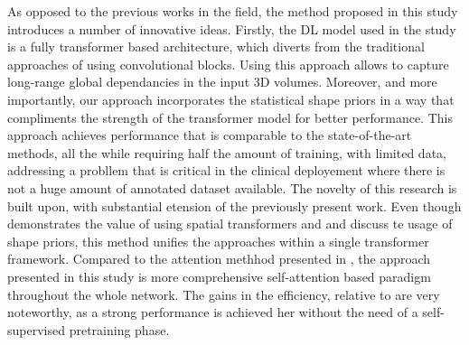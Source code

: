 As opposed to the previous works in the field, the method proposed in this study introduces a number of innovative ideas. Firstly, the DL model used in the study is a fully transformer based architecture, which diverts from the traditional approaches of using convolutional blocks. Using this approach allows to capture long-range global dependancies in the input 3D volumes. Moreover, and more importantly, our approach incorporates the statistical shape priors in a way that compliments the strength of the transformer model for better performance. This approach achieves performance that is comparable to the state-of-the-art methods, all the while requiring half the amount of training, with limited data, addressing a probllem that is critical in the clinical deployement where there is not a huge amount of annotated dataset available. The novelty of this research is built upon, with substantial etension of the previously present work. Even though \cite{10488032} demonstrates the value of using spatial transformers and  and \cite{ZHU2023106954} discuss te usage of shape priors, this method unifies the approaches within a single transformer framework. Compared to the attention methhod presented in \cite{ZHANG2023107267}, the approach presented in this study is more comprehensive self-attention based paradigm throughout the whole network. The gains in the efficiency, relative to \cite{10.1145/3632047.3632078} are very noteworthy, as a strong performance is achieved her without the need of a self-supervised pretraining phase.